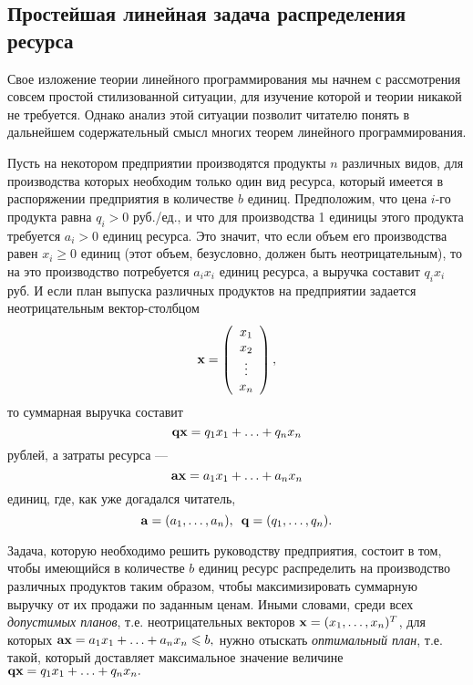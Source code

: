 \subsection{Простейшая линейная задача распределения ресурса}

    Свое изложение теории линейного программирования мы начнем с
    рассмотрения совсем простой стилизованной ситуации, для изучение
    которой и теории никакой не требуется. Однако анализ этой
    ситуации позволит читателю понять в дальнейшем содержательный
    смысл многих теорем линейного программирования.


Пусть на некотором предприятии производятся продукты $n$ различных
видов, для производства которых необходим только один вид ресурса,
который имеется в распоряжении предприятия в количестве $b$ единиц.
Предположим, что цена  $i$-го продукта  равна $q_{i}>0$ руб./ед., и
что
     для производства 1 единицы этого продукта
требуется $a_{i}>0$ единиц ресурса. Это значит, что если объем его
производства равен $x_{i}\geqslant0$
    единиц (этот объем, безусловно, должен быть неотрицательным),
    то на это производство потребуется $a_{i}x_{i}$ единиц ресурса,
    а выручка составит $q_{i}x_{i}$ руб. И если план
    выпуска различных продуктов на предприятии задается неотрицательным
    вектор-столбцом
\[\mathbf{x}=\left(
     \begin{array}{c}
        x_{1} \\
        x_{2} \\
        \vdots \\
        x_{n}  \\
      \end{array}
\right),\]
    то суммарная выручка составит
    \[\mathbf{q}\mathbf{x}=q_{1}x_{1}+\ldots+q_{n}x_{n}\]
    рублей, а затраты ресурса ---
    \[\mathbf{a}\mathbf{x}=a_{1}x_{1}+\ldots+a_{n}x_{n}\]
    единиц, где, как уже догадался читатель,
\[\vc{a}=(a_{1},\ldots,a_{n}), \, \ \vc{q}=(q_{1},\ldots,q_{n}).\]

    Задача, которую необходимо решить руководству предприятия, состоит в том,
чтобы  имеющийся в количестве $b$ единиц ресурс распределить на
производство различных продуктов таким образом, чтобы
максимизировать суммарную выручку от их продажи по заданным ценам.
Иными словами, среди всех \emph{допустимых планов}, т.е.
неотрицательных векторов $\mathbf{x}=(x_{1},\ldots,x_{n})^{T}$, для
которых $\mathbf{a}\mathbf{x}=a_{1}x_{1}+\ldots+a_{n}x_{n}\leqslant b,$
 нужно отыскать \emph{оптимальный план}, т.е. такой, который доставляет максимальное
 значение величине
 $\mathbf{q}\mathbf{x}=q_{1}x_{1}+\ldots+q_{n}x_{n}.$


